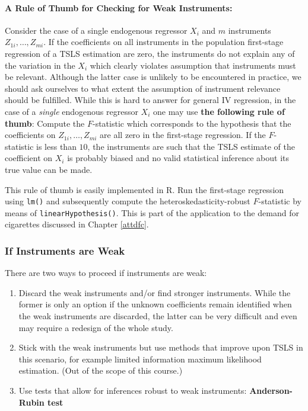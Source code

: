 \documentclass[
  14pt,
]{memoir}
\begin{document}
\paragraph*{A Rule of Thumb for Checking for Weak Instruments:}

Consider the case of a single endogenous regressor \(X_i\) and \(m\) instruments \(Z_{1i},\dots,Z_{mi}\). If the coefficients on all instruments in the population first-stage regression of a TSLS estimation are zero, the instruments do not explain any of the variation in the \(X_i\) which clearly violates assumption that instruments must be relevant. Although the latter case is unlikely to be encountered in practice, we should ask ourselves to what extent the assumption of instrument relevance should be fulfilled. While this is hard to answer for general IV regression, in the case of a \textit{single} endogenous regressor \(X_i\) one may use \textbf{the following rule of thumb}: Compute the \(F\)-statistic which corresponds to the hypothesis that the coefficients on \(Z_{1i},\dots,Z_{mi}\) are all zero in the first-stage regression. If the \(F\)-statistic is less than \(10\), the instruments are  such that the TSLS estimate of the coefficient on \(X_i\) is probably biased and no valid statistical inference about its true value can be made.

This rule of thumb is easily implemented in \textsf{R}. Run the first-stage regression using \texttt{lm()} and subsequently compute the heteroskedasticity-robust \(F\)-statistic by means of \texttt{linearHypothesis()}. This is part of the application to the demand for cigarettes discussed in Chapter \ref{attdfc}.

\hypertarget{if-instruments-are-weak}{%
\subsubsection*{If Instruments are Weak}\label{if-instruments-are-weak}}

There are two ways to proceed if instruments are weak:

\begin{enumerate}
\def\labelenumi{\arabic{enumi}.}
\item
  Discard the weak instruments and/or find stronger instruments. While the former is only an option if the unknown coefficients remain identified when the weak instruments are discarded, the latter can be very difficult and even may require a redesign of the whole study.
\item
  Stick with the weak instruments but use methods that improve upon TSLS in this scenario, for example limited information maximum likelihood estimation. (Out of the scope of this course.)
\item
  Use tests that allow for inferences robust to weak instruments: \textbf{Anderson-Rubin test}
\end{enumerate}
\end{document}
